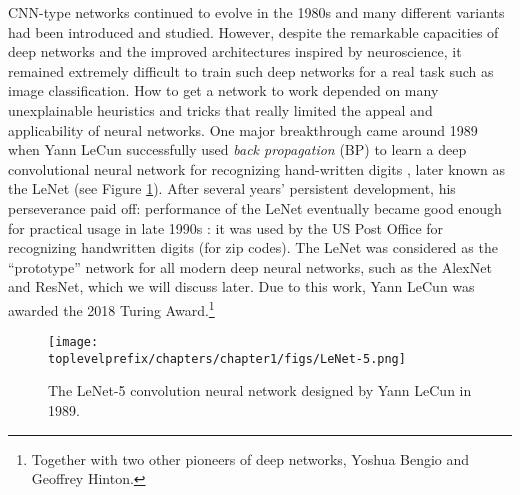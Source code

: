 \documentclass[../../book-main.tex]{subfiles}
\begin{document}
CNN-type networks continued to evolve in the 1980s and many different variants had been introduced and studied. However, despite the remarkable capacities of deep networks and the improved architectures inspired by neuroscience, it remained extremely difficult to train such deep networks for a real task such as image classification. How to get a network to work depended on many unexplainable heuristics and tricks that really limited the appeal and applicability of neural networks. One major breakthrough came around 1989 when Yann LeCun successfully used {\em back propagation} (BP) to learn a deep convolutional neural network for recognizing hand-written digits \cite{LeCun-1989}, later known as the LeNet (see Figure \ref{fig:LeNet-5}). After several years' persistent development, his perseverance paid off: performance of the LeNet eventually became good enough for practical usage in late 1990s \cite{LeCun-1998}: it was used by the US Post Office for recognizing handwritten digits (for zip codes).  The LeNet was considered as the ``prototype'' network for all modern deep neural networks, such as the AlexNet and ResNet, which we will discuss later. Due to this work, Yann LeCun was awarded the 2018 Turing Award.\footnote{Together with two other pioneers of deep networks, Yoshua Bengio and Geoffrey Hinton.}

\begin{figure}
    \centering
\texttt{[image: \\toplevelprefix/chapters/chapter1/figs/LeNet-5.png]}
    \caption{The LeNet-5 convolution neural network designed by Yann LeCun in 1989. }
    \label{fig:LeNet-5}
\end{figure}
\end{document}
